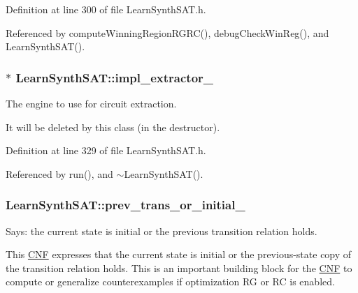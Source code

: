 Definition at line 300 of file Learn\-Synth\-S\-A\-T.\-h.



Referenced by compute\-Winning\-Region\-R\-G\-R\-C(), debug\-Check\-Win\-Reg(), and Learn\-Synth\-S\-A\-T().

\hypertarget{classLearnSynthSAT_a1c7a39732a4ee3cd1ec877f2642046fc}{
\subsubsection[{impl\-\_\-extractor\-\_\-}]{$\ast$ Learn\-Synth\-S\-A\-T\-::impl\-\_\-extractor\-\_\-\hspace{0.3cm}{\ttfamily [protected]}}}\label{classLearnSynthSAT_a1c7a39732a4ee3cd1ec877f2642046fc}


The engine to use for circuit extraction. 

It will be deleted by this class (in the destructor). 

Definition at line 329 of file Learn\-Synth\-S\-A\-T.\-h.



Referenced by run(), and $\sim$\-Learn\-Synth\-S\-A\-T().

\hypertarget{classLearnSynthSAT_a6289a4f041ca85ce44a33143fab42888}{
\subsubsection[{prev\-\_\-trans\-\_\-or\-\_\-initial\-\_\-}]{ Learn\-Synth\-S\-A\-T\-::prev\-\_\-trans\-\_\-or\-\_\-initial\-\_\-\hspace{0.3cm}{\ttfamily [protected]}}}\label{classLearnSynthSAT_a6289a4f041ca85ce44a33143fab42888}


Says\-: the current state is initial or the previous transition relation holds. 

This \hyperlink{classCNF}{C\-N\-F} expresses that the current state is initial or the previous-\/state copy of the transition relation holds. This is an important building block for the \hyperlink{classCNF}{C\-N\-F} to compute or generalize counterexamples if optimization R\-G or R\-C is enabled. 

